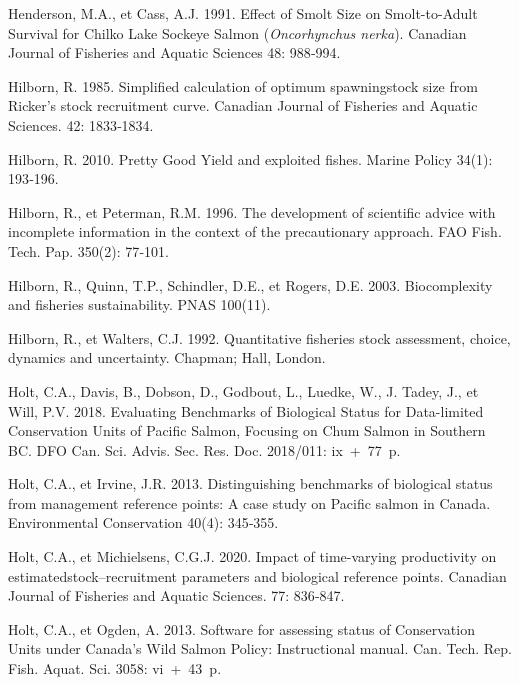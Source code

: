 \documentclass[french,11pt]{book}
\begin{document}
\begin{CSLReferences}{1}{0}
Henderson, M.A., et Cass, A.J. 1991. {Effect of Smolt Size on Smolt-to-Adult Survival for Chilko Lake Sockeye Salmon (}\emph{Oncorhynchus nerka}{)}. Canadian Journal of Fisheries and Aquatic Sciences 48: 988‑994.

Hilborn, R. 1985. {Simplified calculation of optimum spawningstock size from Ricker's stock recruitment curve}. {Canadian Journal of Fisheries and Aquatic Sciences.} 42: 1833‑1834.

Hilborn, R. 2010. {Pretty Good Yield and exploited fishes}. Marine Policy 34(1): 193‑196.

Hilborn, R., et Peterman, R.M. 1996. {The development of scientific advice with incomplete information in the context of the precautionary approach}. FAO Fish. Tech. Pap. 350(2): 77‑101.

Hilborn, R., Quinn, T.P., Schindler, D.E., et Rogers, D.E. 2003. {Biocomplexity and fisheries sustainability}. {PNAS} 100(11).

Hilborn, R., et Walters, C.J. 1992. Quantitative fisheries stock assessment, choice, dynamics and uncertainty. Chapman; Hall, London.

Holt, C.A., Davis, B., Dobson, D., Godbout, L., Luedke, W., J. Tadey, J., et Will, P.V. 2018. {Evaluating Benchmarks of Biological Status for Data-limited Conservation Units of Pacific Salmon, Focusing on Chum Salmon in Southern BC}. {DFO Can. Sci. Advis. Sec. Res. Doc.} 2018/011: ix~+~77~p.

Holt, C.A., et Irvine, J.R. 2013. {Distinguishing benchmarks of biological status from management reference points: A case study on Pacific salmon in Canada}. {Environmental Conservation} 40(4): 345‑355.

Holt, C.A., et Michielsens, C.G.J. 2020. {Impact of time-varying productivity on estimatedstock--recruitment parameters and biological reference points}. {Canadian Journal of Fisheries and Aquatic Sciences.} 77: 836‑847.

Holt, C.A., et Ogden, A. 2013. {Software for assessing status of Conservation Units under Canada's Wild Salmon Policy: Instructional manual}. {Can. Tech. Rep. Fish. Aquat. Sci.} 3058: vi~+~43~p.


\end{CSLReferences}
\end{document}
